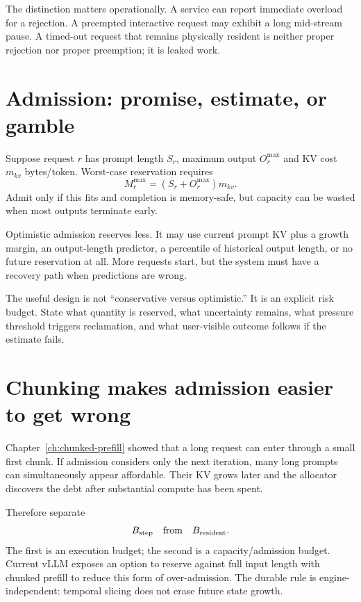 The distinction matters operationally. A service can report immediate overload for a
rejection. A preempted interactive request may exhibit a long mid-stream pause. A
timed-out request that remains physically resident is neither proper rejection nor
proper preemption; it is leaked work.


\section{Admission: promise, estimate, or gamble}

Suppose request $r$ has prompt length $S_r$, maximum output $O_r^{\max}$ and KV cost
$m_{kv}$ bytes/token. Worst-case reservation requires
\[
M_r^{\max}=(S_r+O_r^{\max})m_{kv}.
\]
Admit only if this fits and completion is memory-safe, but capacity can be wasted when
most outputs terminate early.

Optimistic admission reserves less. It may use current prompt KV plus a growth margin,
an output-length predictor, a percentile of historical output length, or no future
reservation at all. More requests start, but the system must have a recovery path
when predictions are wrong.

The useful design is not ``conservative versus optimistic.'' It is an explicit risk
budget. State what quantity is reserved, what uncertainty remains, what pressure
threshold triggers reclamation, and what user-visible outcome follows if the estimate
fails.

\section{Chunking makes admission easier to get wrong}

Chapter~\ref{ch:chunked-prefill} showed that a long request can enter through a small
first chunk. If admission considers only the next iteration, many long prompts can
simultaneously appear affordable. Their KV grows later and the allocator discovers
the debt after substantial compute has been spent.

Therefore separate
\[
B_{\rm step}\quad\text{from}\quad B_{\rm resident}.
\]
The first is an execution budget; the second is a capacity/admission budget. Current
vLLM exposes an option to reserve against full input length with chunked prefill to
reduce this form of over-admission. The durable rule is engine-independent: temporal
slicing does not erase future state growth.

